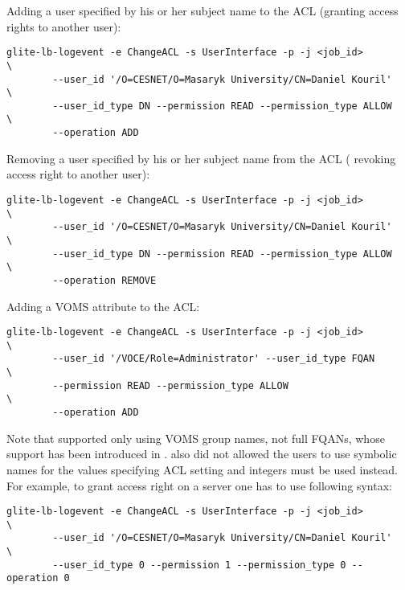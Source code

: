 Adding a user specified by his or her subject name to the ACL (\ie granting
access rights to another user):

\begin{verbatim}
glite-lb-logevent -e ChangeACL -s UserInterface -p -j <job_id>          \
        --user_id '/O=CESNET/O=Masaryk University/CN=Daniel Kouril'     \
        --user_id_type DN --permission READ --permission_type ALLOW     \
        --operation ADD
\end{verbatim}


Removing a user specified by his or her subject name from the ACL (\ie
revoking access right to another user):

\begin{verbatim}
glite-lb-logevent -e ChangeACL -s UserInterface -p -j <job_id>          \
        --user_id '/O=CESNET/O=Masaryk University/CN=Daniel Kouril'     \
        --user_id_type DN --permission READ --permission_type ALLOW     \
        --operation REMOVE
\end{verbatim}


Adding a VOMS attribute to the ACL:

\begin{verbatim}
glite-lb-logevent -e ChangeACL -s UserInterface -p -j <job_id>          \
        --user_id '/VOCE/Role=Administrator' --user_id_type FQAN        \
        --permission READ --permission_type ALLOW                       \
        --operation ADD
\end{verbatim}


Note that  supported only using VOMS group names, not full FQANs,
whose support has been introduced in .  also did not
allowed the users to use symbolic names for the values specifying ACL
setting and integers must be used instead. For example, to grant access
right on a \LBver{1.x} server one has to use following syntax:

\begin{verbatim}
glite-lb-logevent -e ChangeACL -s UserInterface -p -j <job_id>          \
        --user_id '/O=CESNET/O=Masaryk University/CN=Daniel Kouril'     \
        --user_id_type 0 --permission 1 --permission_type 0 --operation 0
\end{verbatim}
